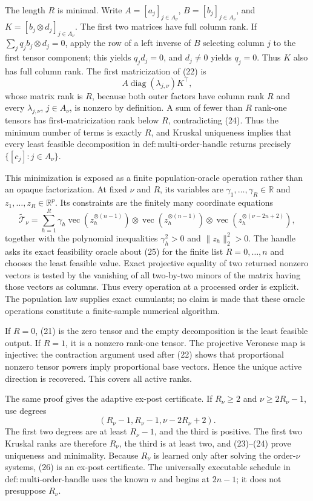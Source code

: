The length \(R\) is minimal. Write \(A=[a_j]_{j\in A_\nu}\), \(B=[b_j]_{j\in A_\nu}\), and \(K=[b_j\otimes d_j]_{j\in A_\nu}\). The first two matrices have full column rank. If \(\sum_j q_jb_j\otimes d_j=0\), apply the row of a left inverse of \(B\) selecting column \(j\) to the first tensor component; this yields \(q_jd_j=0\), and \(d_j\ne0\) yields \(q_j=0\). Thus \(K\) also has full column rank. The first matricization of (22) is
\[
 A\operatorname{diag}(\lambda_{j,\nu})K^\top, \tag{24}
\]
whose matrix rank is \(R\), because both outer factors have column rank \(R\) and every \(\lambda_{j,\nu}\), \(j\in A_\nu\), is nonzero by definition. A sum of fewer than \(R\) rank-one tensors has first-matricization rank below \(R\), contradicting (24). Thus the minimum number of terms is exactly \(R\), and Kruskal uniqueness implies that every least feasible decomposition in \(\mathrm{def{:}multi\text{-}order\text{-}handle}\) returns precisely \(\{[c_j]:j\in A_\nu\}\).

This minimization is exposed as a finite population-oracle operation rather than an opaque factorization. At fixed \(\nu\) and \(R\), its variables are \(\gamma_1,\ldots,\gamma_R\in\mathbb R\) and \(z_1,\ldots,z_R\in\mathbb R^p\). Its constraints are the finitely many coordinate equations
\[
 \widetilde{\mathcal T}_\nu
 =\sum_{h=1}^{R}\gamma_h
 \operatorname{vec}(z_h^{\otimes(n-1)})\otimes
 \operatorname{vec}(z_h^{\otimes(n-1)})\otimes
 \operatorname{vec}(z_h^{\otimes(\nu-2n+2)}), \tag{25}
\]
together with the polynomial inequalities \(\gamma_h^2>0\) and \(\lVert z_h\rVert_2^2>0\). The handle asks its exact feasibility oracle about (25) for the finite list \(R=0,\ldots,n\) and chooses the least feasible value. Exact projective equality of two returned nonzero vectors is tested by the vanishing of all two-by-two minors of the matrix having those vectors as columns. Thus every operation at a processed order is explicit. The population law supplies exact cumulants; no claim is made that these oracle operations constitute a finite-sample numerical algorithm.

If \(R=0\), (21) is the zero tensor and the empty decomposition is the least feasible output. If \(R=1\), it is a nonzero rank-one tensor. The projective Veronese map is injective: the contraction argument used after (22) shows that proportional nonzero tensor powers imply proportional base vectors. Hence the unique active direction is recovered. This covers all active ranks.

The same proof gives the adaptive ex-post certificate. If \(R_\nu\ge2\) and \(\nu\ge2R_\nu-1\), use degrees
\[
 (R_\nu-1,R_\nu-1,\nu-2R_\nu+2). \tag{26}
\]
The first two degrees are at least \(R_\nu-1\), and the third is positive. The first two Kruskal ranks are therefore \(R_\nu\), the third is at least two, and (23)--(24) prove uniqueness and minimality. Because \(R_\nu\) is learned only after solving the order-\(\nu\) systems, (26) is an ex-post certificate. The universally executable schedule in \(\mathrm{def{:}multi\text{-}order\text{-}handle}\) uses the known \(n\) and begins at \(2n-1\); it does not presuppose \(R_\nu\).

